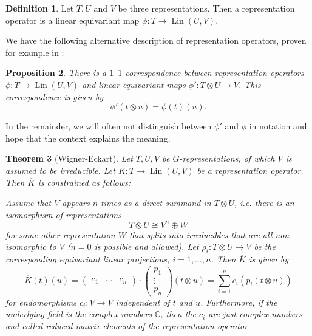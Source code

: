 \documentclass[12pt, a4paper]{article}
\theoremstyle{plain}
\newtheorem{pro}{Proposition}[section]
\newtheorem{thm}[pro]{Theorem}
\theoremstyle{definition}
\newtheorem{dfn}[pro]{Definition}
\theoremstyle{remark}
\newcommand{\C}{\mathds{C}}
\DeclareMathOperator{\lin}{Lin}
\begin{document}
\begin{dfn}
Let $T, U$ and $V$ be three representations. Then a representation operator is a linear equivariant map $\phi: T \to \lin(U, V)$.
\end{dfn}

We have the following alternative description of representation operators, proven for example in \cite{wigner-eckart}:

\begin{pro}\label{correspondence}
There is a $1$–$1$ correspondence between representation operators $\phi: T \to \lin(U,V)$ and linear equivariant maps $\phi': T \otimes U \to V$. This correspondence is given by
\begin{equation*}
\phi'(t \otimes u) = \phi(t)(u).
\end{equation*}
\end{pro}

In the remainder, we will often not distinguish between $\phi'$ and $\phi$ in notation and hope that the context explains the meaning.

\begin{thm}[Wigner-Eckart]\label{theorem}
Let $T, U, V$ be $G$-representations, of which $V$ is assumed to be irreducible. Let $\overline{K}: T \to \lin(U, V)$ be a representation operator. Then $\overline{K}$ is constrained as follows:

Assume that $V$ appears $n$ times as a direct summand in $T \otimes U$, i.e. there is an isomorphism of representations
\begin{equation*}
T \otimes U \cong V^n \oplus W
\end{equation*}
for some other representation $W$ that splits into irreducibles that are all non-isomorphic to $V$ ($n = 0$ is possible and allowed). Let $\rho_i: T \otimes U \to V$ be the corresponding equivariant linear projections, $i = 1, \dots, n$. Then $\overline{K}$ is given by
\begin{equation*}
\overline{K}(t)(u) = \begin{pmatrix}c_1 & \hdots & c_n \end{pmatrix} \cdot \begin{pmatrix} p_1 \\ \vdots \\ p_n \end{pmatrix} (t \otimes u)= \sum_{i = 1}^{n}c_i \left( p_i(t \otimes u) \right)
\end{equation*}
for endomorphisms $c_i: V \to V$ independent of $t$ and $u$. Furthermore, if the underlying field is the complex numbers $\C$, then the $c_i$ are just complex numbers and called reduced matrix elements of the representation operator. 
\end{thm}
\end{document}
